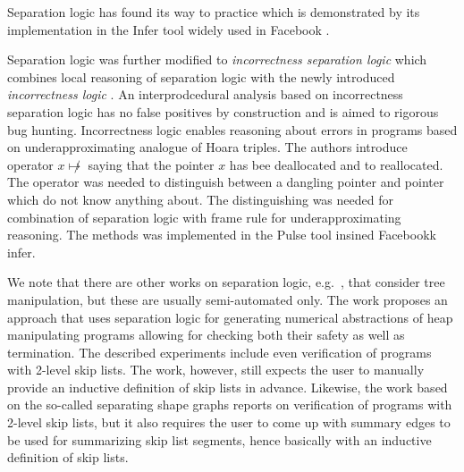 	  Separation logic has found its way to practice which is demonstrated by its implementation
	  in the Infer tool widely used in Facebook \cite{www:fbinfer}.

          Separation logic was further modified to \emph{incorrectness separation logic} \cite{soa-isl} which
          combines local reasoning of separation logic with the newly introduced \emph{incorrectness logic} \cite{soa-il}.
          An interprodcedural analysis based on incorrectness separation logic has no false positives by construction
          and is aimed to rigorous bug hunting.
          Incorrectness logic enables reasoning about errors in programs based on underapproximating analogue
          of Hoara triples. The authors introduce operator $x \not\mapsto$ saying that the pointer $x$ has bee deallocated
          and to reallocated. The operator was needed to distinguish between a dangling pointer and pointer which do not
          know anything about. The distinguishing was needed for combination of separation logic with frame rule
          for underapproximating reasoning.
          The methods was implemented in the Pulse tool insined Facebookk infer.

          We note that there
          are other works on separation logic, e.g.~\cite{ndqc07}, that consider tree
          manipulation, but these are usually semi-automated only. 
          The work \cite{thor10} proposes an approach that uses separation logic for
          generating numerical abstractions of heap manipulating programs allowing for
          checking both their safety as well as termination. The described experiments
          include even verification of programs with 2-level skip lists.
          The work, however,
          still expects the user to manually provide an inductive definition of skip lists
          in advance. Likewise, the work \cite{sas07:chang_rival_necula} based on the so-called separating
          shape graphs reports on verification of programs with 2-level skip lists, but it
          also requires the user to come up with summary edges to be used for summarizing
          skip list segments, hence basically with an inductive definition of skip lists.


